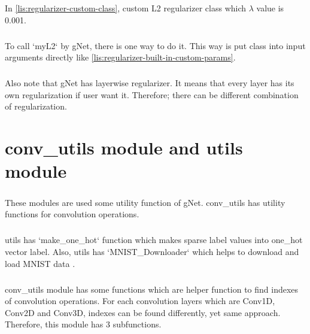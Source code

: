 \documentclass[12pt]{report}
\begin{document}
In \ref{lis:regularizer-custom-class}, custom L2 regularizer class which $\lambda$ value is 0.001.

\paragraph{}
To call `myL2` by gNet, there is one way to do it. This way is put class into input arguments directly like
\ref{lis:regularizer-built-in-custom-params}.

\paragraph{}
Also note that gNet has layerwise regularizer. It means that every layer has its own regularization if user want it. Therefore; there can be different combination of regularization.





\chapter{conv\_utils module and utils module}

\paragraph{}
These modules are used some utility function of gNet. conv\_utils has utility functions for convolution operations.

\paragraph{}
utils has `make\_one\_hot` function which makes sparse label values into one\_hot vector label. Also, utils has `MNIST\_Downloader` which helps to download and load MNIST data \cite{MNIST}.

\paragraph{}
conv\_utils module has some functions which are helper function to find indexes of convolution operations. For each convolution layers which are Conv1D, Conv2D and Conv3D, indexes can be found differently, yet same approach. Therefore, this module has 3 subfunctions. 







\end{document}
